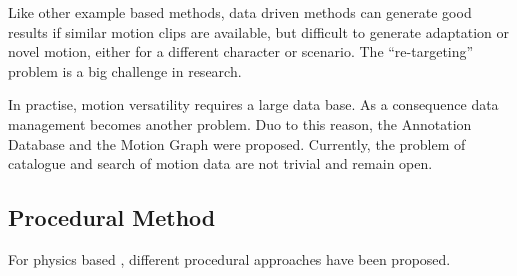 Like other example based methods, data driven methods can generate good results if similar motion clips are available, but difficult to generate  adaptation or novel motion, either for a different character or scenario. 
The  ``re-targeting'' problem is a big challenge in \cms research.

In practise, motion versatility requires a large data base.
As a consequence data management becomes another problem. 
Duo to this reason, the Annotation Database \citep{Arikan2003} and the Motion Graph \citep{kovar2008motion} were proposed. 
Currently, the problem of catalogue and search of motion data are not trivial and remain open\citep{keogh2004indexing,muller2005efficient}.

\subsection{Procedural Method}
For physics based \cms, different procedural approaches have been proposed.
